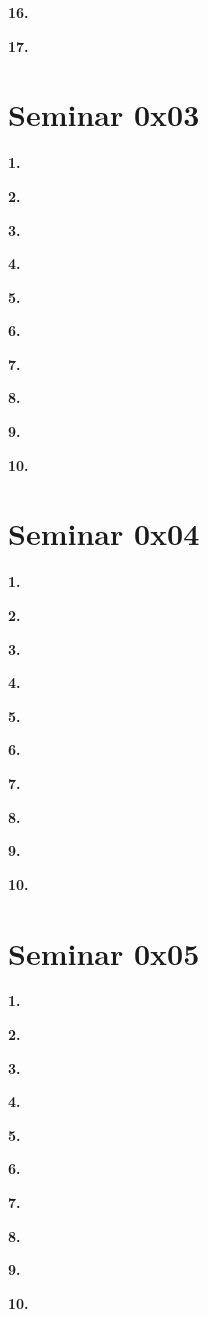 \documentclass[a4paper]{article}
\begin{document}
\textbf{16.}



\textbf{17.}



\section{Seminar 0x03}
\textbf{1.}



\textbf{2.}



\textbf{3.}



\textbf{4.}


\textbf{5.}


\textbf{6.}



\textbf{7.}



\textbf{8.}



\textbf{9.}



\textbf{10.}



\section{Seminar 0x04}
\textbf{1.}



\textbf{2.}



\textbf{3.}



\textbf{4.}


\textbf{5.}


\textbf{6.}



\textbf{7.}



\textbf{8.}



\textbf{9.}



\textbf{10.}



\section{Seminar 0x05}
\textbf{1.}



\textbf{2.}



\textbf{3.}



\textbf{4.}


\textbf{5.}


\textbf{6.}



\textbf{7.}



\textbf{8.}



\textbf{9.}



\textbf{10.}



\end{document}
